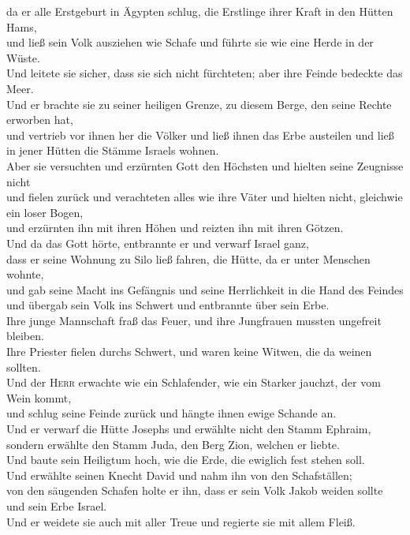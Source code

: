  da er alle Erstgeburt in Ägypten schlug, die Erstlinge
ihrer Kraft in den Hütten Hams,\\
 und ließ sein Volk ausziehen wie Schafe und führte sie
wie eine Herde in der Wüste.\\
 Und leitete sie sicher, dass sie sich nicht fürchteten;
aber ihre Feinde bedeckte das Meer.\\
 Und er brachte sie zu seiner heiligen Grenze, zu diesem
Berge, den seine Rechte erworben hat,\\
 und vertrieb vor ihnen her die Völker und ließ ihnen das
Erbe austeilen und ließ in jener Hütten die Stämme Israels wohnen.\\
 Aber sie versuchten und erzürnten Gott den Höchsten und
hielten seine Zeugnisse nicht\\
 und fielen zurück und verachteten alles wie ihre Väter
und hielten nicht, gleichwie ein loser Bogen,\\
 und erzürnten ihn mit ihren Höhen und reizten ihn mit
ihren Götzen.\\
 Und da das Gott hörte, entbrannte er und verwarf Israel
ganz,\\
 dass er seine Wohnung zu Silo ließ fahren, die Hütte, da
er unter Menschen wohnte,\\
 und gab seine Macht ins Gefängnis und seine Herrlichkeit
in die Hand des Feindes\\
 und übergab sein Volk ins Schwert und entbrannte über
sein Erbe.\\
 Ihre junge Mannschaft fraß das Feuer, und ihre
Jungfrauen mussten ungefreit bleiben.\\
 Ihre Priester fielen durchs Schwert, und waren keine
Witwen, die da weinen sollten.\\
 Und der \textsc{Herr} erwachte wie ein Schlafender, wie
ein Starker jauchzt, der vom Wein kommt,\\
 und schlug seine Feinde zurück und hängte ihnen ewige
Schande an.\\
 Und er verwarf die Hütte Josephs und erwählte nicht den
Stamm Ephraim,\\
 sondern erwählte den Stamm Juda, den Berg Zion, welchen
er liebte.\\
 Und baute sein Heiligtum hoch, wie die Erde, die
ewiglich fest stehen soll.\\
 Und erwählte seinen Knecht David und nahm ihn von den
Schafställen;\\
 von den säugenden Schafen holte er ihn, dass er sein
Volk Jakob weiden sollte und sein Erbe Israel.\\
 Und er weidete sie auch mit aller Treue und regierte sie
mit allem Fleiß.

